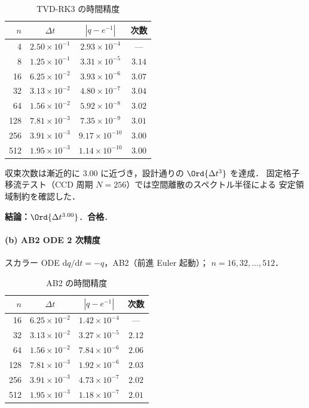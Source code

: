 \begin{table}[htbp]
\centering
\caption{TVD-RK3 の時間精度}
\label{tab:tvd_rk3}
\renewcommand{\arraystretch}{1.2}
\footnotesize
\begin{tabular}{rc cc}
\toprule
$n$ & $\Delta t$ & $|q - e^{-1}|$ & 次数 \\
\midrule
  4 & $2.50 \times 10^{-1}$ & $2.93 \times 10^{-4}$  & ---    \\
  8 & $1.25 \times 10^{-1}$ & $3.31 \times 10^{-5}$  & $3.14$ \\
 16 & $6.25 \times 10^{-2}$ & $3.93 \times 10^{-6}$  & $3.07$ \\
 32 & $3.13 \times 10^{-2}$ & $4.80 \times 10^{-7}$  & $3.04$ \\
 64 & $1.56 \times 10^{-2}$ & $5.92 \times 10^{-8}$  & $3.02$ \\
128 & $7.81 \times 10^{-3}$ & $7.35 \times 10^{-9}$  & $3.01$ \\
256 & $3.91 \times 10^{-3}$ & $9.17 \times 10^{-10}$ & $3.00$ \\
512 & $1.95 \times 10^{-3}$ & $1.14 \times 10^{-10}$ & $3.00$ \\
\bottomrule
\end{tabular}
\end{table}

収束次数は漸近的に $3.00$ に近づき，設計通りの $\Ord{\Delta t^3}$ を達成．
固定格子移流テスト（CCD 周期 $N = 256$）では空間離散のスペクトル半径による
安定領域制約を確認した．

\noindent\textbf{結論：}$\Ord{\Delta t^{3.00}}$．\textbf{合格}．

\paragraph{(b) AB2 ODE 2 次精度}
\label{sec:verify_ab2}

スカラー ODE $\mathrm{d}q/\mathrm{d}t = -q$，AB2（前進 Euler 起動）；
$n = 16, 32, \ldots, 512$．

\begin{table}[htbp]
\centering
\caption{AB2 の時間精度}
\label{tab:ab2_time}
\renewcommand{\arraystretch}{1.2}
\footnotesize
\begin{tabular}{rc cc}
\toprule
$n$ & $\Delta t$ & $|q - e^{-1}|$ & 次数 \\
\midrule
 16 & $6.25 \times 10^{-2}$ & $1.42 \times 10^{-4}$ & ---    \\
 32 & $3.13 \times 10^{-2}$ & $3.27 \times 10^{-5}$ & $2.12$ \\
 64 & $1.56 \times 10^{-2}$ & $7.84 \times 10^{-6}$ & $2.06$ \\
128 & $7.81 \times 10^{-3}$ & $1.92 \times 10^{-6}$ & $2.03$ \\
256 & $3.91 \times 10^{-3}$ & $4.73 \times 10^{-7}$ & $2.02$ \\
512 & $1.95 \times 10^{-3}$ & $1.18 \times 10^{-7}$ & $2.01$ \\
\bottomrule
\end{tabular}
\end{table}


